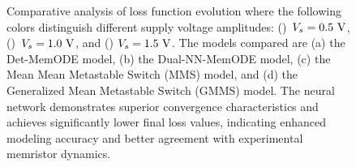 \documentclass[lettersize,journal]{IEEEtran}
\begin{document}
\begin{figure}[!t]
  \centering

  \caption{Comparative analysis of loss function evolution where the following colors distinguish different supply voltage amplitudes: (\redbar{})~\(V_s=0.5\rm \ V\), (\bluebar{})~\(V_s=1.0\rm \ V\), and (\greenbar{}) \(V_s=1.5\rm \ V\). The models compared are (a) the Det-MemODE model, (b) the Dual-NN-MemODE model, (c) the Mean Mean Metastable Switch (MMS) model, and (d) the Generalized Mean Metastable Switch (GMMS) model. The neural network demonstrates superior convergence characteristics and achieves significantly lower final loss values, indicating enhanced modeling accuracy and better agreement with experimental memristor dynamics.}
  \label{fig:comparison_mms}
\end{figure}
\end{document}
